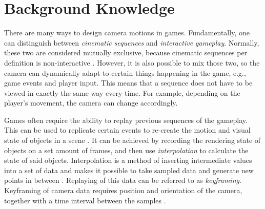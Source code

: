 \section{Background Knowledge}

There are many ways to design camera motions in games. Fundamentally, one can distinguish between \textit{cinematic sequences} and \textit{interactive gameplay}. Normally, these two are considered mutually exclusive, because cinematic sequences per definition is non-interactive \cite{haigh-hutchinson_real-time_2009}. However, it is also possible to mix those two, so the camera can dynamically adapt to certain things happening in the game, e.g., game events and player input. This means that a sequence does not have to be viewed in exactly the same way every time. For example, depending on the player's movement, the camera can change accordingly.


Games often require the ability to replay previous sequences of the gameplay. This can be used to replicate certain events to re-create the motion and visual state of objects in a scene \cite{haigh-hutchinson_real-time_2009}. It can be achieved by recording the rendering state of objects on a set amount of frames, and then use \textit{interpolation} to calculate the state of said objects. Interpolation is a method of inserting intermediate values into a set of data and makes it possible to take sampled data and generate new points in between \cite{haigh-hutchinson_real-time_2009}. Replaying of this data can be referred to as \textit{keyframing}. Keyframing of camera data requires position and orientation of the camera, together with a time interval between the samples \cite{haigh-hutchinson_real-time_2009}.